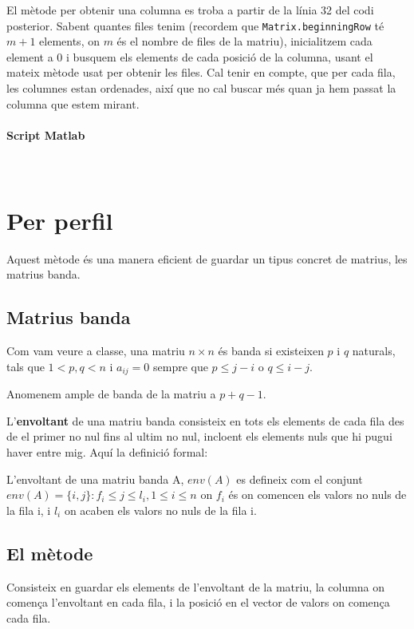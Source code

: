 \documentclass[11pt,a4paper,twoside]{report}
\begin{document}
El mètode per obtenir una columna es troba a partir de la línia 32 del codi posterior. Sabent quantes files tenim (recordem que \texttt{Matrix.beginningRow} té $m+1$ elements, on $m$ és el nombre de files de la matriu), inicialitzem cada element a 0 i busquem els elements de cada posició de la columna, usant el mateix mètode usat per obtenir les files. Cal tenir en compte, que per cada fila, les columnes estan ordenades, així que no cal buscar més quan ja hem passat la columna que estem mirant.

\paragraph*{Script Matlab} \mbox{} \\




\section{Per perfil}

 
 Aquest mètode és una manera eficient de guardar un tipus concret de matrius, les matrius banda.
 
\subsection{Matrius banda}	 

Com vam veure a classe, 
una matriu $n \times n$ és banda si existeixen $p$ i $q$ naturals, tals que $1< p, q < n$  i $a_{i j} = 0$ sempre que $p \leq j - i$ o $q \leq i-j$. 

Anomenem ample de banda de la matriu a $p + q - 1$.

L'\textbf{envoltant} de una matriu banda consisteix en tots els elements de cada fila des de el primer no nul fins al ultim no nul, incloent els elements nuls que hi pugui haver entre mig.  Aquí la definició formal:

L'envoltant de una matriu banda A, $env(A)$ es defineix com el conjunt $env(A) = \{i, j\} : f_i \leq j \leq l_i, 1 \leq i \leq n $ on $f_i$ és on comencen els valors no nuls de la fila i, i $l_i$ on acaben els valors no nuls de la fila i.

 \subsection{El mètode}
 
 Consisteix en guardar els elements de l'envoltant de la matriu, la columna on comença l'envoltant en cada fila, i la posició en el vector de valors on comença cada fila.
 
\end{document}
